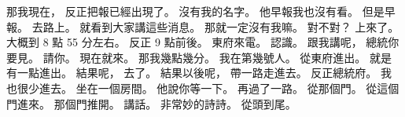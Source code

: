 \hypertarget{c01:cue:3178}{}那我現在，
\hypertarget{c01:cue:3179}{}反正把報已經出現了。
\hypertarget{c01:cue:3180}{}沒有我的名字。
\hypertarget{c01:cue:3181}{}他早報我也沒有看。
\hypertarget{c01:cue:3182}{}但是早報。
\hypertarget{c01:cue:3183}{}去路上。
\hypertarget{c01:cue:3184}{}就看到大家講這些消息。
\hypertarget{c01:cue:3185}{}那就一定沒有我嘛。
\hypertarget{c01:cue:3186}{}對不對？
\hypertarget{c01:cue:3187}{}上來了。
\hypertarget{c01:cue:3188}{}大概到 8 點 55 分左右。
\hypertarget{c01:cue:3189}{}反正 9 點前後。
\hypertarget{c01:cue:3190}{}東府來電。
\hypertarget{c01:cue:3191}{}認識。
\hypertarget{c01:cue:3192}{}跟我講呢，
\hypertarget{c01:cue:3193}{}總統你要見。
\hypertarget{c01:cue:3194}{}請你。
\hypertarget{c01:cue:3195}{}現在就來。
\hypertarget{c01:cue:3196}{}那我幾點幾分。
\hypertarget{c01:cue:3197}{}我在第幾號人。
\hypertarget{c01:cue:3198}{}從東府進出。
\hypertarget{c01:cue:3199}{}就是有一點進出。
\hypertarget{c01:cue:3200}{}結果呢，
\hypertarget{c01:cue:3201}{}去了。
\hypertarget{c01:cue:3202}{}結果以後呢，
\hypertarget{c01:cue:3203}{}帶一路走進去。
\hypertarget{c01:cue:3204}{}反正總統府。
\hypertarget{c01:cue:3205}{}我也很少進去。
\hypertarget{c01:cue:3206}{}坐在一個房間。
\hypertarget{c01:cue:3207}{}他說你等一下。
\hypertarget{c01:cue:3208}{}再過了一路。
\hypertarget{c01:cue:3209}{}從那個門。
\hypertarget{c01:cue:3210}{}從這個門進來。
\hypertarget{c01:cue:3211}{}那個門推開。
\hypertarget{c01:cue:3212}{}講話。
\hypertarget{c01:cue:3213}{}非常妙的詩詩。
\hypertarget{c01:cue:3214}{}從頭到尾。
